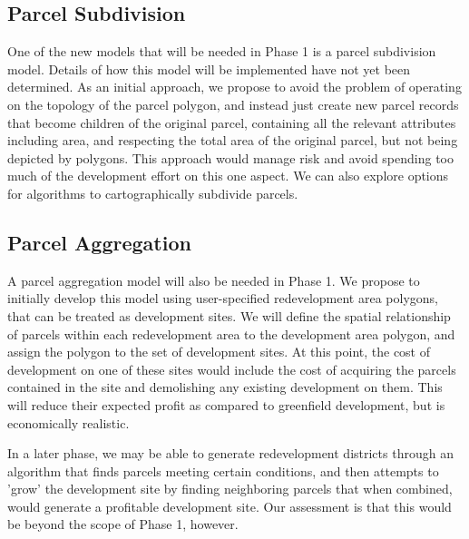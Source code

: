 \subsection{Parcel Subdivision}
One of the new models that will be needed in Phase 1 is a parcel
subdivision model.  Details of how this model will be implemented
have not yet been determined.  As an initial approach, we propose to
avoid the problem of operating on the topology of the parcel
polygon, and instead just create new parcel records that become
children of the original parcel, containing all the relevant
attributes including area, and respecting the total area of the
original parcel, but not being depicted by polygons.  This approach
would manage risk and avoid spending too much of the development
effort on this one aspect.  We can also explore options for
algorithms to cartographically subdivide parcels.

\subsection{Parcel Aggregation}
A parcel aggregation model will also be needed in Phase 1.  We
propose to initially develop this model using user-specified
redevelopment area polygons, that can be treated as development
sites.  We will define the spatial relationship of parcels within
each redevelopment area to the development area polygon, and assign
the polygon to the set of development sites.  At this point, the
cost of development on one of these sites would include the cost of
acquiring the parcels contained in the site and demolishing any
existing development on them.  This will reduce their expected
profit as compared to greenfield development, but is economically
realistic.

In a later phase, we may be able to generate redevelopment districts
through an algorithm that finds parcels meeting certain conditions,
and then attempts to 'grow' the development site by finding
neighboring parcels that when combined, would generate a profitable
development site.  Our assessment is that this would be beyond the
scope of Phase 1, however.
